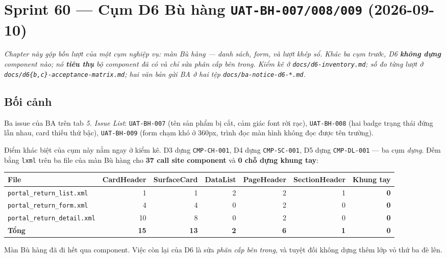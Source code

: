 \chapter{Sprint 60 --- Cụm D6 Bù hàng \texttt{UAT-BH-007/008/009} (2026-09-10)}

\emph{Chapter này gộp bốn lượt của một cụm nghiệp vụ: màn Bù hàng --- danh sách, form, và lượt
khép sổ. Khác ba cụm trước, D6 \textbf{không dựng} component nào; nó \textbf{tiêu thụ} bộ
component đã có và chỉ sửa phân cấp bên trong. Kiểm kê ở \texttt{docs/d6-inventory.md}; số đo
từng lượt ở \texttt{docs/d6\{b,c\}-acceptance-matrix.md}; hai văn bản gửi BA ở hai tệp
\texttt{docs/ba-notice-d6-*.md}.}

\section{Bối cảnh}

Ba issue của BA trên tab \emph{5. Issue List}: \texttt{UAT-BH-007} (tên sản phẩm bị cắt, cảm giác
font rời rạc), \texttt{UAT-BH-008} (hai badge trạng thái đứng lẫn nhau, card thiếu thứ bậc),
\texttt{UAT-BH-009} (form chạm khó ở 360px, trình đọc màn hình không đọc được tên trường).

Điểm khác biệt của cụm này nằm ngay ở kiểm kê. D3 dựng \texttt{CMP-CH-001}, D4 dựng
\texttt{CMP-SC-001}, D5 dựng \texttt{CMP-DL-001} --- ba cụm \emph{dựng}. Đếm bằng \texttt{lxml}
trên ba file của màn Bù hàng cho \textbf{37 call site component} và \textbf{0 chỗ dựng khung tay}:

\begin{center}
\begin{tabular}{lrrrrrr}
\hline
File & CardHeader & SurfaceCard & DataList & PageHeader & SectionHeader & Khung tay \\
\hline
\texttt{portal\_return\_list.xml}   & 1  & 1  & 2 & 2 & 1 & \textbf{0} \\
\texttt{portal\_return\_form.xml}   & 4  & 4  & 0 & 2 & 0 & \textbf{0} \\
\texttt{portal\_return\_detail.xml} & 10 & 8  & 0 & 2 & 0 & \textbf{0} \\
\hline
\textbf{Tổng} & \textbf{15} & \textbf{13} & \textbf{2} & \textbf{6} & \textbf{1} & \textbf{0} \\
\hline
\end{tabular}
\end{center}

Màn Bù hàng đã đi hết qua component. Việc còn lại của D6 là sửa \emph{phân cấp bên trong}, và
tuyệt đối không dựng thêm lớp vỏ thứ ba đè lên.

